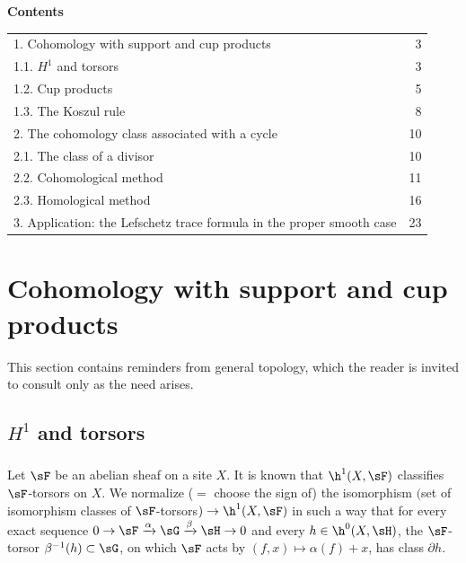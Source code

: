 \begin{center}\textbf{Contents}\end{center}
\begin{tabular}{p{}r}
1. Cohomology with support and cup products & 3\\
1.1. $H^1$ and torsors & 3\\
1.2. Cup products & 5\\
1.3. The Koszul rule & 8\\
2. The cohomology class associated with a cycle & 10\\
2.1. The class of a divisor & 10\\
2.2. Cohomological method & 11\\
2.3. Homological method & 16\\
3. Application: the Lefschetz trace formula in the proper smooth case & 23
\end{tabular}

\section{Cohomology with support and cup products}\label{IV:1}

This section contains reminders from general topology, which the reader is
invited to consult only as the need arises.










\subsection{\texorpdfstring{$H^1$}{H1} and torsors}\label{IV:1-1}






\subsubsection{}\label{IV:1-1-1}

Let $\sF$ be an abelian sheaf on a site $X$. It is known that
$\h^1(X,\sF)$ classifies $\sF$-torsors on $X$. We normalize ($=$ choose the
sign of) the isomorphism $($set of isomorphism classes of
$\sF$-torsors$)\to \h^1(X,\sF)$ in such a way that for every exact sequence
$0\to \sF\xrightarrow\alpha\sG\xrightarrow\beta\sH\to 0$ and every
$h\in\h^0(X,\sH)$, the $\sF$-torsor $\beta^{-1}(h)\subset \sG$, on which
$\sF$ acts by $(f,x)\mapsto \alpha(f)+x$, has class $\partial h$.






